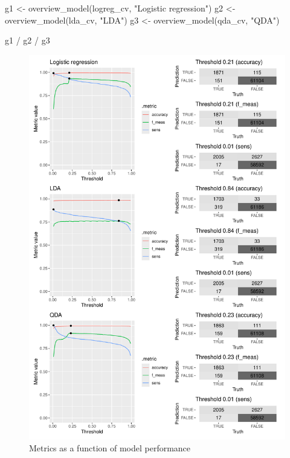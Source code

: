\documentclass[
]{article}
\newenvironment{Shaded}{\begin{snugshade}}{\end{snugshade}}
\newcommand{\FunctionTok}[1]{\textcolor[rgb]{0.00,0.00,0.00}{#1}}
\newcommand{\NormalTok}[1]{#1}
\newcommand{\OtherTok}[1]{\textcolor[rgb]{0.56,0.35,0.01}{#1}}
\newcommand{\SpecialCharTok}[1]{\textcolor[rgb]{0.00,0.00,0.00}{#1}}
\newcommand{\StringTok}[1]{\textcolor[rgb]{0.31,0.60,0.02}{#1}}
\begin{document}
\begin{Shaded}
\begin{Highlighting}[]
\NormalTok{g1 }\OtherTok{\textless{}{-}} \FunctionTok{overview\_model}\NormalTok{(logreg\_cv, }\StringTok{"Logistic regression"}\NormalTok{)}
\NormalTok{g2 }\OtherTok{\textless{}{-}} \FunctionTok{overview\_model}\NormalTok{(lda\_cv, }\StringTok{"LDA"}\NormalTok{)}
\NormalTok{g3 }\OtherTok{\textless{}{-}} \FunctionTok{overview\_model}\NormalTok{(qda\_cv, }\StringTok{"QDA"}\NormalTok{)}

\NormalTok{g1 }\SpecialCharTok{/}\NormalTok{ g2 }\SpecialCharTok{/}\NormalTok{ g3}
\end{Highlighting}
\end{Shaded}

\begin{figure}[H]

{\centering \includegraphics[width=0.8\linewidth]{ProjectPart1_MERGED_files/figure-latex/print threshold graphs-1} 

}

\caption{Metrics as a function of model performance}\label{fig:print threshold graphs}
\end{figure}
\end{document}
